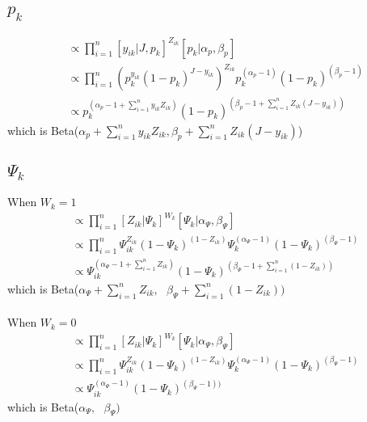 \documentclass[fleqn]{article}
\begin{document}
\subsection{$p_k$}
%
\begin{align*}
  [p_k | \cdot] & \propto \prod_{i = 1}^n [y_{ik} | J, p_k]^{Z_{ik}} [p_k | \alpha_p, \beta_p]\\
  & \propto \prod_{i = 1}^n \left( p_k^{y_{ik}} (1 - p_k)^{J - y_{ik}} \right)^{Z_{ik}} p_k^{(\alpha_p - 1)} (1 - p_k)^{(\beta_p - 1)}\\
    & \propto p_k^{\left( \alpha_p - 1 + \sum_{i = 1}^n y_{ik} Z_{ik} \right)} (1 - p_k)^{\left( \beta_p - 1 + \sum_{i = 1}^n Z_{ik} (J - y_{ik}) \right)}
\end{align*}
%
which is Beta($\alpha_p + \sum_{i = 1}^n y_{ik} Z_{ik}, \beta_p + \sum_{i = 1}^n Z_{ik} (J - y_{ik})$)
%
\subsection{$\Psi_k$}
%
When $W_k = 1$
%
\begin{align*}
  [\Psi_k | \cdot] & \propto \prod_{i = 1}^n [Z_{ik} | \Psi_k]^{W_k} [\Psi_k | \alpha_\Psi, \beta_\Psi]\\
  & \propto \prod_{i = 1}^n \Psi_{ik}^{Z_{ik}} (1 - \Psi_k)^{(1 - Z_{ik})} \Psi_k^{(\alpha_\Psi - 1)} (1 - \Psi_k)^{(\beta_\Psi - 1)}\\
  & \propto \Psi_{ik}^{(\alpha_\Psi - 1 + \sum_{i = 1}^n Z_{ik})} (1 - \Psi_k)^{(\beta_\Psi - 1 + \sum_{i = 1}^n (1 - Z_{ik}))}
\end{align*}
which is Beta($\alpha_\Psi + \sum_{i = 1}^n Z_{ik}, \mbox{ } \beta_\Psi + \sum_{i = 1}^n (1 - Z_{ik}))$\\
\\
%
When $W_k = 0$
%
\begin{align*}
  [\Psi_k | \cdot] & \propto \prod_{i = 1}^n [Z_{ik} | \Psi_k]^{W_k} [\Psi_k | \alpha_\Psi, \beta_\Psi]\\
  & \propto \prod_{i = 1}^n \Psi_{ik}^{Z_{ik}} (1 - \Psi_k)^{(1 - Z_{ik})} \Psi_k^{(\alpha_\Psi - 1)} (1 - \Psi_k)^{(\beta_\Psi - 1)}\\
  & \propto \Psi_{ik}^{(\alpha_\Psi - 1)} (1 - \Psi_k)^{(\beta_\Psi - 1))}
\end{align*}
which is Beta($\alpha_\Psi , \mbox{ } \beta_\Psi)$
%
\end{document}
